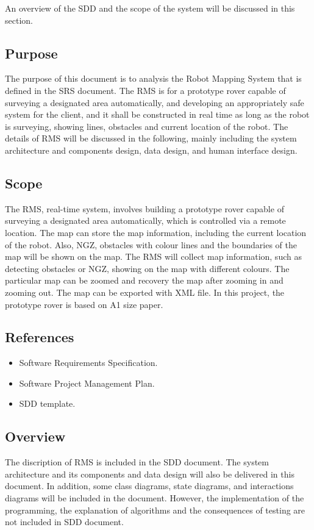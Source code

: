 An overview of the SDD and the scope of the system will be discussed in this section.

\subsection{Purpose}
The purpose of this document is to analysis the Robot Mapping System that is defined in the SRS document.  The RMS is for a prototype rover capable of surveying a designated area automatically, and developing an appropriately safe system for the client, and it shall be constructed  in real time as long as the robot is surveying, showing lines, obstacles and current location of the robot. The details of RMS will be discussed in the following, mainly including the system architecture and components design, data design, and human interface design.

\subsection{Scope}
The RMS, real-time system, involves building a prototype rover capable of surveying a designated area automatically, which is controlled via a remote location. The map can store the map information, including the current location of the robot. Also, NGZ, obstacles with colour lines and the boundaries of the map will be shown on the map.  The RMS will collect map information, such as detecting obstacles or NGZ, showing on the map with different colours. The particular map can be zoomed and recovery the map after zooming in and zooming out.  The map can be exported with XML file.
In this project, the prototype rover is based on A1 size paper.


\subsection{References}
\begin{itemize}
	\item Software Requirements Specification.
	\item Software Project Management Plan.
	\item SDD template.
\end{itemize}	

\subsection{Overview}
The discription of RMS is included in the SDD document. The system architecture and its components and data design will also be delivered in this document. In addition, some class diagrams, state diagrams, and interactions diagrams will be included in the document. However, the implementation of the programming, the explanation of algorithms and the consequences of testing are not included in SDD document. 

